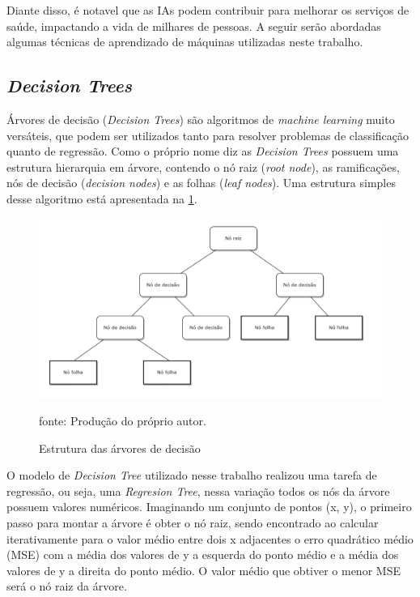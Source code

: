 \documentclass[
  12pt,		%
  a4paper,	%
  openright,%
  oneside,	%
  chapter=TITLE,		%
  section=TITLE,		%
  english,	%
  french,	%
  spanish,	%
  brazil	%
]{abntex2}
\begin{document}
    Diante disso, é notavel que as IAs podem contribuir para melhorar os serviços de saúde, impactando a vida
    de milhares de pessoas. A seguir serão abordadas algumas técnicas de aprendizado de máquinas utilizadas neste trabalho.

    \subsection{\textit{Decision Trees}}
    
    Árvores de decisão (\textit{Decision Trees}) são algoritmos de \textit{machine learning} muito versáteis, que podem ser utilizados
    tanto para resolver problemas de classificação quanto de regressão.
    Como o próprio nome diz as \textit{Decision Trees} possuem uma estrutura hierarquia em árvore, contendo o nó raiz (\textit{root node}),
    as ramificações, nós de decisão (\textit{decision nodes}) e as folhas (\textit{leaf nodes}). Uma estrutura simples desse algoritmo
    está apresentada na \ref*{estrutura_decision_tree}.

    \begin{figure}[ht]
        \centering
        \caption{Estrutura das árvores de decisão}
        \includegraphics[width=13cm]{../reports/figures/decision_tree_exemple.png}
        \label{estrutura_decision_tree}
        \par
        {\small fonte: Produção do próprio autor.}
    \end{figure}

    O modelo de \textit{Decision Tree} utilizado nesse trabalho realizou uma tarefa de regressão, ou seja, uma \textit{Regresion Tree}, nessa variação 
    todos os nós da árvore possuem valores numéricos. Imaginando um conjunto de pontos (x, y), o primeiro passo para montar a árvore é obter o 
    nó raiz, sendo encontrado ao calcular iterativamente para o valor médio entre dois x adjacentes o erro quadrático médio (MSE) com a média
    dos valores de y a esquerda do ponto médio e a média dos valores de y a direita do ponto médio. O valor médio que obtiver o menor MSE
    será o nó raiz da árvore.
\end{document}
